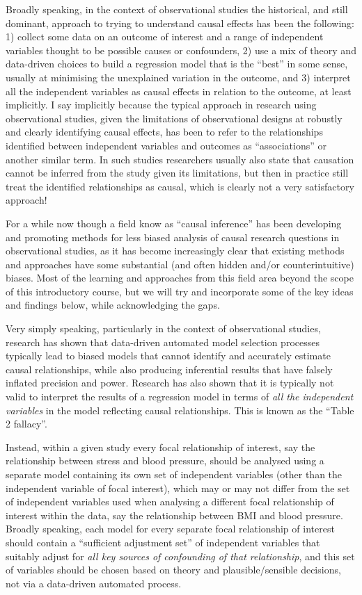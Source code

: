 \documentclass[
]{book}
\begin{document}
Broadly speaking, in the context of observational studies the historical, and still dominant, approach to trying to understand causal effects has been the following: 1) collect some data on an outcome of interest and a range of independent variables thought to be possible causes or confounders, 2) use a mix of theory and data-driven choices to build a regression model that is the ``best'' in some sense, usually at minimising the unexplained variation in the outcome, and 3) interpret all the independent variables as causal effects in relation to the outcome, at least implicitly. I say implicitly because the typical approach in research using observational studies, given the limitations of observational designs at robustly and clearly identifying causal effects, has been to refer to the relationships identified between independent variables and outcomes as ``associations'' or another similar term. In such studies researchers usually also state that causation cannot be inferred from the study given its limitations, but then in practice still treat the identified relationships as causal, which is clearly not a very satisfactory approach!

For a while now though a field know as ``causal inference'' has been developing and promoting methods for less biased analysis of causal research questions in observational studies, as it has become increasingly clear that existing methods and approaches have some substantial (and often hidden and/or counterintuitive) biases. Most of the learning and approaches from this field area beyond the scope of this introductory course, but we will try and incorporate some of the key ideas and findings below, while acknowledging the gaps.

Very simply speaking, particularly in the context of observational studies, research has shown that data-driven automated model selection processes typically lead to biased models that cannot identify and accurately estimate causal relationships, while also producing inferential results that have falsely inflated precision and power. Research has also shown that it is typically not valid to interpret the results of a regression model in terms of \emph{all the independent variables} in the model reflecting causal relationships. This is known as the ``Table 2 fallacy''.

Instead, within a given study every focal relationship of interest, say the relationship between stress and blood pressure, should be analysed using a separate model containing its own set of independent variables (other than the independent variable of focal interest), which may or may not differ from the set of independent variables used when analysing a different focal relationship of interest within the data, say the relationship between BMI and blood pressure. Broadly speaking, each model for every separate focal relationship of interest should contain a ``sufficient adjustment set'' of independent variables that suitably adjust for \emph{all key sources of confounding of that relationship}, and this set of variables should be chosen based on theory and plausible/sensible decisions, not via a data-driven automated process.
\end{document}
